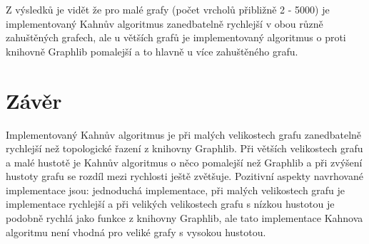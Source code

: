 \documentclass[12pt]{report}
\begin{document}
Z výsledků je vidět že pro malé grafy (počet vrcholů přibližně 2 - 5000) je implementovaný Kahnův algoritmus zanedbatelně rychlejší v obou různě zahuštěných grafech, ale u větších grafů je implementovaný algoritmus o proti knihovně Graphlib pomalejší a to hlavně u více zahuštěného grafu. 

\newpage
\section*{Závěr}

	Implementovaný Kahnův algoritmus je při malých velikostech grafu zanedbatelně rychlejší než topologické řazení z knihovny Graphlib. Při větších velikostech grafu a malé hustotě je Kahnův algoritmus o něco pomalejší než Graphlib a při zvýšení hustoty grafu se rozdíl mezi rychlosti ještě zvětšuje. Pozitivní aspekty navrhované implementace jsou: jednoduchá implementace, při malých velikostech grafu je implementace rychlejší a při velikých velikostech grafu s nízkou hustotou je podobně rychlá jako funkce z knihovny Graphlib, ale tato implementace Kahnova algoritmu  není vhodná pro veliké grafy s vysokou hustotou.



\end{document}
